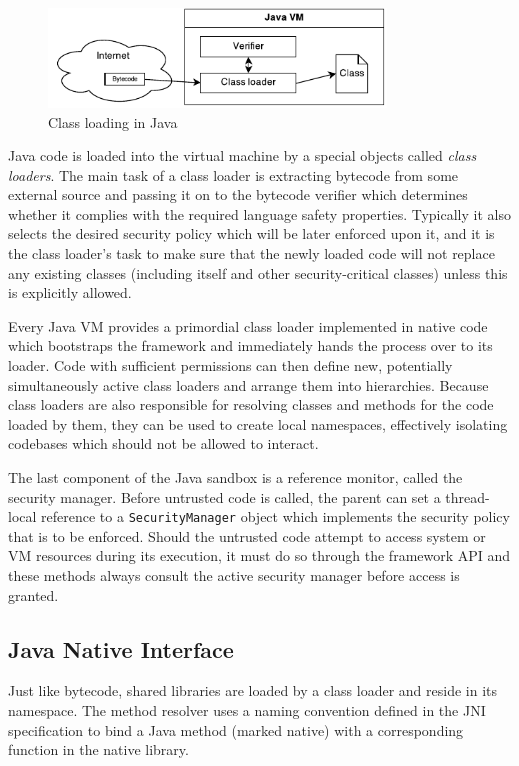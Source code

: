 \documentclass[a4paper,12pt,twoside,openright]{report}
\newcommand{\keyword}[1]{\textsf{#1}}
\newcommand{\class}[1]{\texttt{#1}}
\begin{document}
\begin{figure}
	\centering
	\includegraphics[width=0.8\textwidth]{dia_java_classload.pdf}
	\caption{Class loading in Java}
\end{figure}

Java code is loaded into the virtual machine by a special objects called \emph{class loaders}. The main task of a class loader is extracting bytecode from some external source and passing it on to the bytecode verifier which determines whether it complies with the required language safety properties. Typically it also selects the desired security policy which will be later enforced upon it, and it is the class loader's task to make sure that the newly loaded code will not replace any existing classes (including itself and other security-critical classes) unless this is explicitly allowed. 

Every Java VM provides a primordial class loader implemented in native code which bootstraps the framework and immediately hands the process over to its loader. Code with sufficient permissions can then define new, potentially simultaneously active class loaders and arrange them into hierarchies. Because class loaders are also responsible for resolving classes and methods for the code loaded by them, they can be used to create local namespaces, effectively isolating codebases which should not be allowed to interact.

The last component of the Java sandbox is a reference monitor, called the security manager. Before untrusted code is called, the parent can set a thread-local reference to a \class{SecurityManager} object which implements the security policy that is to be enforced. Should the untrusted code attempt to access system or VM resources during its execution, it must do so through the framework API and these methods always consult the active security manager before access is granted.

\subsection{Java Native Interface}

Just like bytecode, shared libraries are loaded by a class loader and reside in its namespace. The method resolver uses a naming convention defined in the JNI specification to bind a Java method (marked \keyword{native}) with a corresponding function in the native library.
\end{document}
